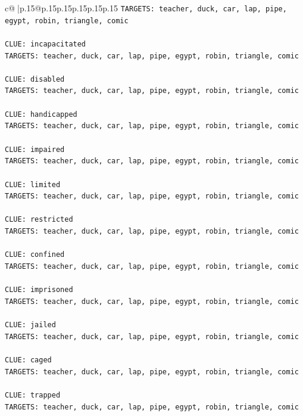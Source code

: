 \documentclass{article}
\begin{document}
{\begin{supertabular}{c@{$\;$}|p{.15\linewidth}@{}p{.15\linewidth}p{.15\linewidth}p{.15\linewidth}p{.15\linewidth}p{.15\linewidth}}
{{{\texttt{TARGETS: teacher, duck, car, lap, pipe, egypt, robin, triangle, comic} \\
\\ 
\texttt{CLUE: incapacitated} \\
\texttt{TARGETS: teacher, duck, car, lap, pipe, egypt, robin, triangle, comic} \\
\\ 
\texttt{CLUE: disabled} \\
\texttt{TARGETS: teacher, duck, car, lap, pipe, egypt, robin, triangle, comic} \\
\\ 
\texttt{CLUE: handicapped} \\
\texttt{TARGETS: teacher, duck, car, lap, pipe, egypt, robin, triangle, comic} \\
\\ 
\texttt{CLUE: impaired} \\
\texttt{TARGETS: teacher, duck, car, lap, pipe, egypt, robin, triangle, comic} \\
\\ 
\texttt{CLUE: limited} \\
\texttt{TARGETS: teacher, duck, car, lap, pipe, egypt, robin, triangle, comic} \\
\\ 
\texttt{CLUE: restricted} \\
\texttt{TARGETS: teacher, duck, car, lap, pipe, egypt, robin, triangle, comic} \\
\\ 
\texttt{CLUE: confined} \\
\texttt{TARGETS: teacher, duck, car, lap, pipe, egypt, robin, triangle, comic} \\
\\ 
\texttt{CLUE: imprisoned} \\
\texttt{TARGETS: teacher, duck, car, lap, pipe, egypt, robin, triangle, comic} \\
\\ 
\texttt{CLUE: jailed} \\
\texttt{TARGETS: teacher, duck, car, lap, pipe, egypt, robin, triangle, comic} \\
\\ 
\texttt{CLUE: caged} \\
\texttt{TARGETS: teacher, duck, car, lap, pipe, egypt, robin, triangle, comic} \\
\\ 
\texttt{CLUE: trapped} \\
\texttt{TARGETS: teacher, duck, car, lap, pipe, egypt, robin, triangle, comic} \\
}}}
\end{supertabular}}
\end{document}
